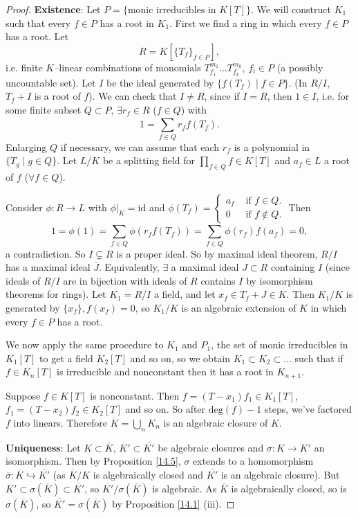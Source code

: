 \documentclass{article}
\theoremstyle{definition}
\begin{document}
\begin{proof}
    \textbf{Existence}: Let $P = \{\text{monic irreducibles in }K[T]\}$. We will construct $K_1$ such that every $f \in P$ has a root in $K_1$. First we find a ring in which every $f \in P$ has a root. Let \[
    R = K[\{T_f\}_{f \in P}],
    \]
    i.e. finite $K$--linear combinations of monomials $T_{f_1}^{m_1}\ldots T_{f_k}^{m_k}$, $f_i \in P$ (a possibly uncountable set). Let $I$ be the ideal generated by $\{f(T_f) \mid f \in P\}$. (In $R/I$, $T_f+I$ is a root of $f$). We can check that $I \neq R$, since if $I = R$, then $1 \in I$, i.e. for some finite subset $Q \subset P$, $\exists r_f \in R$ ($f \in Q$) with $$1=\sum_{f \in Q}^{} r_f f(T_f).$$ Enlarging $Q$ if necessary, we can assume that each $r_f$ is a polynomial in $\{T_g \mid g \in Q\}$. Let $L/K$ be a splitting field for $\prod_{f \in Q}^{} f \in K[T]$ and $a_f \in L$ a root of $f$ ($\forall f \in Q$).

    Consider $\phi : R \to L$ with $\phi|_K = \text{id}$ and $\phi(T_f) = \begin{cases}
        a_f &\text{ if }f \in Q.\\
        0 &\text{ if }f \not\in Q.
    \end{cases}$ 
    Then \[
        1 = \phi(1) = \sum_{f \in Q}^{} \phi(r_f f(T_f)) = \sum_{f \in Q}^{} \phi(r_f) f(a_f) = 0,
    \]
    a contradiction. So $I \subsetneq R$ is a proper ideal. So by maximal ideal theorem, $R/I$ has a maximal ideal $\overline{J}$. Equivalently, $\exists$ a maximal ideal $J \subset R$ containing $I$ (since ideals of $R/I$ are in bijection with ideals of $R$ contains $I$ by isomorphism theorems for rings). Let $K_1 = R/I$ a field, and let $x_f \in T_f + J \in K$. Then $K_1/K$ is generated by $\{x_f\}, f(x_f)=0$, so $K_1/K$ is an algebraic extension of $K$ in which every $f \in P$ has a root.
    \vspace{1mm}
    
    We now apply the same procedure to $K_1$ and $P_1$, the set of monic irreducibles in $K_1[T]$ to get a field $K_2[T]$ and so on, so we obtain $K_1 \subset K_2 \subset \ldots$ such that if $f \in K_n[T]$ is irreducible and nonconstant then it has a root in $K_{n+1}$. 

    Suppose $f \in K[T]$ is nonconstant. Then $f=(T-x_1)f_1 \in K_1[T]$, $f_1=(T-x_2)f_2 \in K_2[T]$ and so on. So after $\text{deg}(f)-1$ steps, we've factored $f$ into linears. Therefore $\overline{K} = \bigcup_{n} K_n$ is an algebraic closure of $K$.
    \vspace{1mm}
    
    \textbf{Uniqueness}: Let $K \subset \overline{K}$, $K' \subset \overline{K'}$ be algebraic closures and $\sigma : K \to K'$ an isomorphism. Then by Proposition \ref{14.5}, $\sigma$ extends to a homomorphism $\overline{\sigma}: \overline{K} \hookrightarrow \overline{K'}$ (as $\overline{K}/K$ is algebraically closed and $\overline{K'}$ is an algebraic closure). But $K' \subset \sigma(\overline{K}) \subset \overline{K'}$, so $\overline{K'}/\sigma(\overline{K})$ is algebraic. As $\overline{K}$ is algebraically closed, so is $\sigma(\overline{K})$, so $\overline{K'}=\sigma(\overline{K})$ by Proposition \ref{14.1} (iii).
\end{proof}
\end{document}
